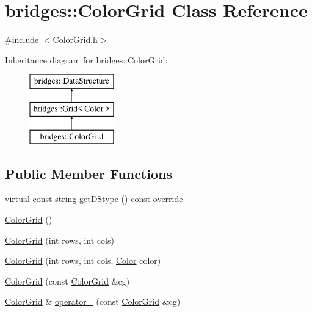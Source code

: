 \hypertarget{classbridges_1_1_color_grid}{}\section{bridges\+::Color\+Grid Class Reference}
\label{classbridges_1_1_color_grid}


{\ttfamily \#include $<$Color\+Grid.\+h$>$}

Inheritance diagram for bridges\+::Color\+Grid\+:\begin{figure}[H]
\begin{center}
\leavevmode
\includegraphics[height=3.000000cm]{classbridges_1_1_color_grid}
\end{center}
\end{figure}
\subsection*{Public Member Functions}
\begin{DoxyCompactItemize}
\item 
virtual const string \mbox{\hyperlink{classbridges_1_1_color_grid_a6bb93994dade8e79a197459532dad153}{get\+D\+Stype}} () const override
\item 
\mbox{\hyperlink{classbridges_1_1_color_grid_a00f6ca6b903228b78538a9f0511ffe46}{Color\+Grid}} ()
\item 
\mbox{\hyperlink{classbridges_1_1_color_grid_ac5fb993701683939d96fd7ac6515efc3}{Color\+Grid}} (int rows, int cols)
\item 
\mbox{\hyperlink{classbridges_1_1_color_grid_a4b731632c040f1fb05636127627603d5}{Color\+Grid}} (int rows, int cols, \mbox{\hyperlink{classbridges_1_1_color}{Color}} color)
\item 
\mbox{\hyperlink{classbridges_1_1_color_grid_a52d98fe72dde164f98e015b11113e592}{Color\+Grid}} (const \mbox{\hyperlink{classbridges_1_1_color_grid}{Color\+Grid}} \&cg)
\item 
\mbox{\hyperlink{classbridges_1_1_color_grid}{Color\+Grid}} \& \mbox{\hyperlink{classbridges_1_1_color_grid_a3d0da9296d6c96207e612bfccd1f3514}{operator=}} (const \mbox{\hyperlink{classbridges_1_1_color_grid}{Color\+Grid}} \&cg)
\end{DoxyCompactItemize}
